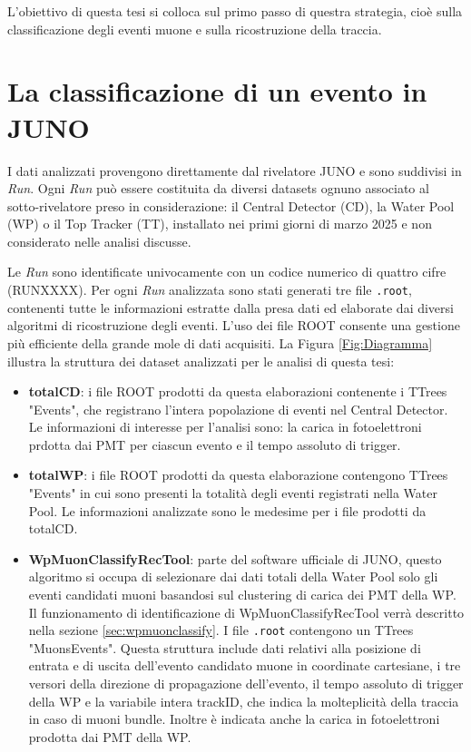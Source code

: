 L'obiettivo di questa tesi si colloca sul primo passo di questra strategia, cioè sulla classificazione degli eventi muone e sulla ricostruzione della traccia.
\section{La classificazione di un evento in JUNO}
I dati analizzati provengono direttamente dal rivelatore JUNO e sono suddivisi in \textit{Run}. Ogni \textit{Run} può essere costituita da diversi datasets ognuno associato al sotto-rivelatore preso in considerazione: il Central Detector (CD), la Water Pool (WP) o il Top Tracker (TT), installato nei primi giorni di marzo 2025 e non considerato nelle analisi discusse. 

Le \textit{Run} sono identificate univocamente con un codice numerico di quattro cifre (RUNXXXX).  Per ogni \textit{Run} analizzata sono stati generati tre file \texttt{.root}, contenenti tutte le informazioni estratte dalla presa dati ed elaborate dai diversi algoritmi di ricostruzione degli eventi. L'uso dei file ROOT consente una gestione più efficiente della grande mole di dati acquisiti. La Figura \ref{Fig:Diagramma} illustra la struttura dei dataset analizzati per le analisi di questa tesi:
\begin{itemize}
    \item \textbf{totalCD}: i file ROOT prodotti da questa elaborazioni contenente i TTrees "Events", che registrano l'intera popolazione di eventi nel Central Detector. Le informazioni di interesse per l'analisi sono: la carica in fotoelettroni prdotta dai PMT per ciascun evento e il tempo assoluto di trigger.
    \item \textbf{totalWP}: i file ROOT prodotti da questa elaborazione contengono TTrees "Events" in cui sono presenti la totalità degli eventi registrati nella Water Pool. Le informazioni analizzate sono le medesime per i file prodotti da totalCD.
    \item \textbf{WpMuonClassifyRecTool}: parte del software ufficiale di JUNO, questo algoritmo si occupa di selezionare dai dati totali della Water Pool solo gli eventi candidati muoni basandosi sul clustering di carica dei PMT della WP. Il funzionamento di identificazione di WpMuonClassifyRecTool verrà descritto nella sezione \ref{sec:wpmuonclassify}. I file \texttt{.root} contengono un TTrees "MuonsEvents". Questa struttura include dati relativi alla posizione di entrata e di uscita dell'evento candidato muone in coordinate cartesiane, i tre versori della direzione di propagazione dell'evento, il tempo assoluto di trigger della WP e la variabile intera trackID, che indica la molteplicità della traccia in caso di muoni bundle. Inoltre è indicata anche la carica in fotoelettroni prodotta dai PMT della WP.
\end{itemize}
